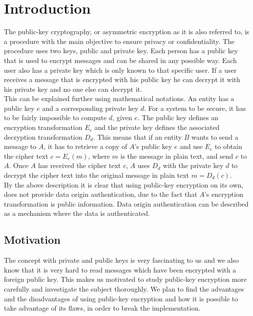 \documentclass{acm_proc_article-sp}
\begin{document}
\section{Introduction}
The public-key cryptography, or asymmetric encryption as it is also referred to, is a procedure with the main objective to ensure privacy or confidentiality. The procedure uses two keys, public and private key. Each person has a public key that is used to encrypt messages and can be shared in any possible way. Each user also has a private key which is only known to that specific user. If a user receives a message that is encrypted with his public key he can decrypt it with his private key and no one else can decrypt it. \\
This can be explained further using mathematical notations. An entity has a public key $e$ and a corresponding private key $d$. For a system to be secure, it has to be fairly impossible to compute $d$, given $e$. The public key defines an encryption transformation $E_e$ and the private key defines the associated decryption transformation $D_d$. This means that if an entity $B$ wants to send a message to $A$, it has to retrieve a copy of $A$'s public key $e$ and use $E_e$ to obtain the cipher text $c=E_e(m)$, where $m$ is the message in plain text, and send $c$ to $A$. Once $A$ has received the cipher text $c$, $A$ uses $D_d$ with the private key $d$ to decrypt the cipher text into the original message in plain text $m=D_d(c)$. \cite{handcrypt}\\
By the above description it is clear that using public-key encryption on its own, does not provide data origin authentication, due to the fact that $A$'s encryption transformation is public information. Data origin authentication can be described as a  mechanism where the data is authenticated. \cite{handcrypt} \pagebreak


\subsection{Motivation}
The concept with private and public keys is very fascinating to us and we also know that it is very hard to read messages which have been encrypted with a foreign public key. This makes us motivated to study public-key encryption more carefully and investigate the subject thoroughly. We plan to find the advantages and the disadvantages of using public-key encryption and how it is possible to take advantage of its flaws, in order to break the implementation. 
\end{document}
